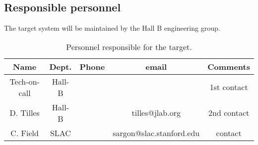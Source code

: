 \subsection{Responsible personnel}

\indent

The target system will be maintained by the Hall B engineering group.  

 \begin{table}[!htb]
 \centering
 \begin{tabular}{|c|c|c|c|c|}
\hline
 Name&Dept.&Phone&email&Comments \\ \hline
 Tech-on-call & Hall-B&&& 1st contact  \\ \hline
 D. Tilles & Hall-B&&tilles@jlab.org&2nd contact \\ \hline
C. Field& SLAC&&sargon@slac.stanford.edu&contact \\ \hline
 \end{tabular}
\caption{ Personnel responsible for the target.} 
\label{tb:target}
\end{table}


